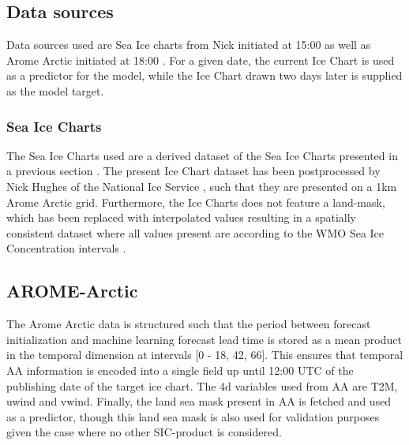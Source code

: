 \documentclass[../main/thesis]{subfiles}
\begin{document}


\subsection{Data sources}
Data sources used are Sea Ice charts from Nick initiated at 15:00 as well as Arome Arctic initiated at 18:00 \cite{Dinessen2020,Mueller2017}. For a given date, the current Ice Chart is used as a predictor for the model, while the Ice Chart drawn two days later is supplied as the model target.

\subsubsection{Sea Ice Charts}
The Sea Ice Charts used are a derived dataset of the Sea Ice Charts presented in a previous section . The present Ice Chart dataset has been postprocessed by Nick Hughes of the National Ice Service , such that they are presented on a 1km Arome Arctic grid. Furthermore, the Ice Charts does not feature a land-mask, which has been replaced with interpolated values resulting in a spatially consistent dataset where all values present are according to the WMO Sea Ice Concentration intervals \cite{JETSI2014}. 

\subsection{AROME-Arctic}
The Arome Arctic data is structured such that the period between forecast initialization and machine learning forecast lead time is stored as a mean product in the temporal dimension at intervals [0 - 18, 42, 66]. This ensures that temporal AA information is encoded into a single field up until 12:00 UTC of the publishing date of the target ice chart. The 4d variables used from AA are T2M, uwind and vwind. Finally, the land sea mask present in AA is fetched and used as a predictor, though this land sea mask is also used for validation purposes given the case where no other SIC-product is considered.
\end{document}
